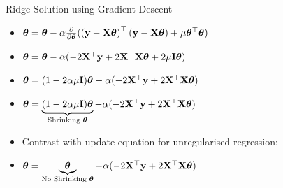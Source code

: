 \documentclass{beamer}
\begin{document}
\begin{frame}{Ridge Solution using Gradient Descent}
\begin{itemize}[<+->]
	\item \(\boldsymbol{\theta}=\boldsymbol{\theta} - \alpha \frac{\partial}{\partial \boldsymbol{\theta}}(\left(\mathbf{y}-\mathbf{X}\boldsymbol{\theta}\right)^{\top}\left(\mathbf{y}-\mathbf{X}\boldsymbol{\theta}\right)+\mu\boldsymbol{\theta}^{\top}\boldsymbol{\theta})\) 
	\item \(\boldsymbol{\theta}=\boldsymbol{\theta} - \alpha(-2 \mathbf{X}^{\top} \mathbf{y}+2 \mathbf{X}^{\top} \mathbf{X} \boldsymbol{\theta} + 2\mu \mathbf{I} \boldsymbol{\theta})\)
	\item \(\boldsymbol{\theta}=(1-2\alpha\mu \mathbf{I})\boldsymbol{\theta} - \alpha(-2 \mathbf{X}^{\top} \mathbf{y}+2 \mathbf{X}^{\top} \mathbf{X} \boldsymbol{\theta})\)
	\item \(\boldsymbol{\theta}=\underbrace{(1-2\alpha\mu \mathbf{I})\boldsymbol{\theta}}_\text{Shrinking $\boldsymbol{\theta}$} - \alpha(-2 \mathbf{X}^{\top} \mathbf{y}+2 \mathbf{X}^{\top} \mathbf{X} \boldsymbol{\theta})\)
\end{itemize}
\pause \begin{itemize}

	\item Contrast with update equation for unregularised regression:
	\item \(\boldsymbol{\theta}=\underbrace{\boldsymbol{\theta}}_\text{No Shrinking $\boldsymbol{\theta}$} - \alpha(-2 \mathbf{X}^{\top} \mathbf{y}+2 \mathbf{X}^{\top} \mathbf{X} \boldsymbol{\theta})\)
	
\end{itemize}

\end{frame}

%	
\end{document}
